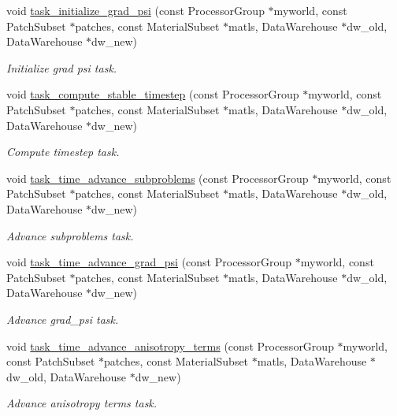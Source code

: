 \begin{DoxyCompactItemize}
void \hyperlink{classUintah_1_1PhaseField_1_1PureMetal_afafe9580fa5ea1dfc87a3c8324d75fed}{task\+\_\+initialize\+\_\+grad\+\_\+psi} (const Processor\+Group $\ast$myworld, const Patch\+Subset $\ast$patches, const Material\+Subset $\ast$matls, Data\+Warehouse $\ast$dw\+\_\+old, Data\+Warehouse $\ast$dw\+\_\+new)
\begin{DoxyCompactList}\small\item\em Initialize grad psi task. \end{DoxyCompactList}\item 
void \hyperlink{classUintah_1_1PhaseField_1_1PureMetal_a451bc6cbdfb785c0b45187e50e285cd7}{task\+\_\+compute\+\_\+stable\+\_\+timestep} (const Processor\+Group $\ast$myworld, const Patch\+Subset $\ast$patches, const Material\+Subset $\ast$matls, Data\+Warehouse $\ast$dw\+\_\+old, Data\+Warehouse $\ast$dw\+\_\+new)
\begin{DoxyCompactList}\small\item\em Compute timestep task. \end{DoxyCompactList}\item 
void \hyperlink{classUintah_1_1PhaseField_1_1PureMetal_a4ab7b6cf53bfca0e4ddd9fed7a9cd18c}{task\+\_\+time\+\_\+advance\+\_\+subproblems} (const Processor\+Group $\ast$myworld, const Patch\+Subset $\ast$patches, const Material\+Subset $\ast$matls, Data\+Warehouse $\ast$dw\+\_\+old, Data\+Warehouse $\ast$dw\+\_\+new)
\begin{DoxyCompactList}\small\item\em Advance subproblems task. \end{DoxyCompactList}\item 
void \hyperlink{classUintah_1_1PhaseField_1_1PureMetal_ae6b7b081d56883a560eae38949580b74}{task\+\_\+time\+\_\+advance\+\_\+grad\+\_\+psi} (const Processor\+Group $\ast$myworld, const Patch\+Subset $\ast$patches, const Material\+Subset $\ast$matls, Data\+Warehouse $\ast$dw\+\_\+old, Data\+Warehouse $\ast$dw\+\_\+new)
\begin{DoxyCompactList}\small\item\em Advance grad\+\_\+psi task. \end{DoxyCompactList}\item 
void \hyperlink{classUintah_1_1PhaseField_1_1PureMetal_a8098e2a2b58380a57be4de4e1339d329}{task\+\_\+time\+\_\+advance\+\_\+anisotropy\+\_\+terms} (const Processor\+Group $\ast$myworld, const Patch\+Subset $\ast$patches, const Material\+Subset $\ast$matls, Data\+Warehouse $\ast$dw\+\_\+old, Data\+Warehouse $\ast$dw\+\_\+new)
\begin{DoxyCompactList}\small\item\em Advance anisotropy terms task. \end{DoxyCompactList}\item 

\end{DoxyCompactItemize}
